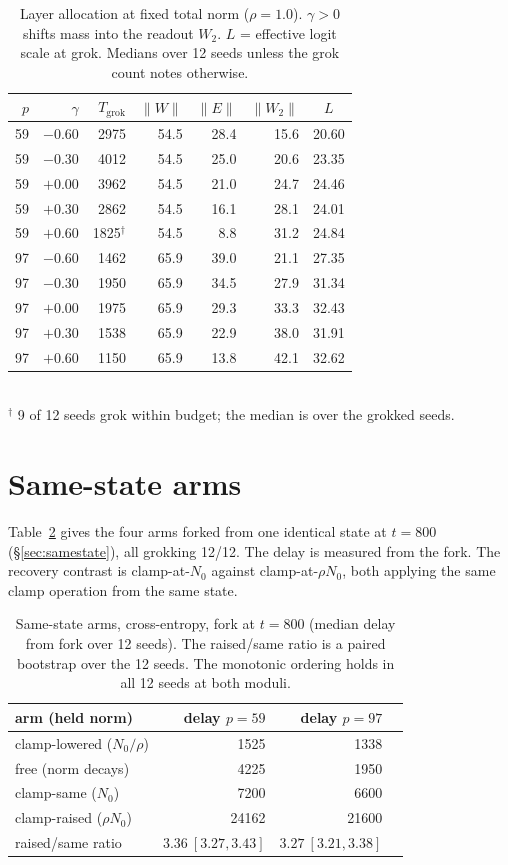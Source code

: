 \begin{table}[h]\centering\small
\caption{Layer allocation at fixed total norm ($\rho=1.0$). $\gamma>0$ shifts mass into the readout
$W_2$. $L$ = effective logit scale at grok. Medians over 12 seeds unless the grok count notes otherwise.}
\label{tab:alloc}
\begin{tabular}{rrrrrrc}
\toprule
$p$ & $\gamma$ & $T_{\mathrm{grok}}$ & $\|W\|$ & $\|E\|$ & $\|W_2\|$ & $L$ \\
\midrule
59 & $-0.60$ & 2975 & 54.5 & 28.4 & 15.6 & 20.60 \\
59 & $-0.30$ & 4012 & 54.5 & 25.0 & 20.6 & 23.35 \\
59 & $+0.00$ & 3962 & 54.5 & 21.0 & 24.7 & 24.46 \\
59 & $+0.30$ & 2862 & 54.5 & 16.1 & 28.1 & 24.01 \\
59 & $+0.60$ & 1825$^{\dagger}$ & 54.5 & 8.8 & 31.2 & 24.84 \\
\midrule
97 & $-0.60$ & 1462 & 65.9 & 39.0 & 21.1 & 27.35 \\
97 & $-0.30$ & 1950 & 65.9 & 34.5 & 27.9 & 31.34 \\
97 & $+0.00$ & 1975 & 65.9 & 29.3 & 33.3 & 32.43 \\
97 & $+0.30$ & 1538 & 65.9 & 22.9 & 38.0 & 31.91 \\
97 & $+0.60$ & 1150 & 65.9 & 13.8 & 42.1 & 32.62 \\
\bottomrule
\end{tabular}
\\[2pt]
{\footnotesize $^{\dagger}$ 9 of 12 seeds grok within budget; the median is over the grokked seeds.}
\end{table}

\section{Same-state arms}

Table~\ref{tab:samestate} gives the four arms forked from one identical state at $t=800$ (\S\ref{sec:samestate}),
all grokking 12/12. The delay is measured from the fork. The recovery contrast is clamp-at-$N_0$ against
clamp-at-$\rho N_0$, both applying the same clamp operation from the same state.

\begin{table}[h]\centering\small
\caption{Same-state arms, cross-entropy, fork at $t=800$ (median delay from fork over 12 seeds). The
raised/same ratio is a paired bootstrap over the 12 seeds. The monotonic ordering holds in all 12 seeds at
both moduli.}
\label{tab:samestate}
\begin{tabular}{lrrr}
\toprule
arm (held norm) & delay $p=59$ & delay $p=97$ \\
\midrule
clamp-lowered ($N_0/\rho$) & 1525 & 1338 \\
free (norm decays) & 4225 & 1950 \\
clamp-same ($N_0$) & 7200 & 6600 \\
clamp-raised ($\rho N_0$) & 24162 & 21600 \\
\midrule
raised/same ratio & $3.36\ [3.27,3.43]$ & $3.27\ [3.21,3.38]$ \\
\bottomrule
\end{tabular}
\end{table}

